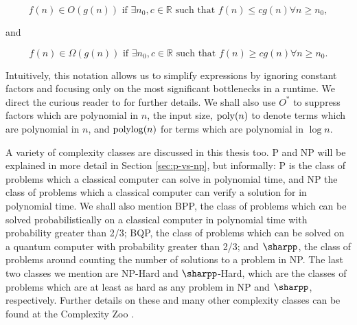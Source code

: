 \begin{equation}
f(n) \in O(g(n)) \textrm{ if } \exists n_0, c \in \mathbb{R} \textrm{ such that } f(n) \leq cg(n) \forall n \geq n_0,
\end{equation}

\noindent and

\begin{equation}
f(n) \in \Omega(g(n)) \textrm{ if } \exists n_0, c \in \mathbb{R} \textrm{ such that } f(n) \geq cg(n) \forall n \geq n_0.
\end{equation}

Intuitively, this notation allows us to simplify expressions by ignoring constant factors and focusing only on the most significant bottlenecks in a runtime. We direct the curious reader to \cite{clrs} for further details. We shall also use $O^*$ to suppress factors which are polynomial in $n$, the input size, $\operatorname{poly}(n)$ to denote terms which are polynomial in $n$, and $\operatorname{polylog}(n)$ for terms which are polynomial in $\log n$.

A variety of complexity classes are discussed in this thesis too. P and NP will be explained in more detail in Section \ref{sec:p-vs-np}, but informally: P is the class of problems which a classical computer can solve in polynomial time, and NP the class of problems which a classical computer can verify a solution for in polynomial time. We shall also mention BPP, the class of problems which can be solved probabilistically on a classical computer in polynomial time with probability greater than 2/3; BQP, the class of problems which can be solved on a quantum computer with probability greater than 2/3; and $\sharpp$, the class of problems around counting the number of solutions to a problem in NP. The last two classes we mention are NP-Hard and $\sharpp$-Hard, which are the classes of problems which are at least as hard as any problem in NP and $\sharpp$, respectively. Further details on these and many other complexity classes can be found at the Complexity Zoo \cite{complexityzoo}.
